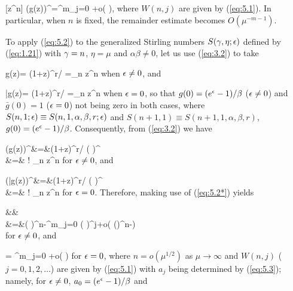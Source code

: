 \be\label{eq:5.2*}
 [z^n] (g(z))^\mu =\sum^m_{j=0} +o\left( \right),
\ee
where $W(n,j)$ are given by (\ref{eq:5.1}).
In particular, when $n$ is fixed, the remainder estimate becomes $O(\mu^{-m-1})$.

To apply (\ref{eq:5.2}) to the generalized Stirling numbers $S({\gamma}, \eta;{\epsilon})$ defined by (\ref{eq:1.21}) with ${\gamma}=n$, $\eta=\mu$ and $\alpha \beta \not= 0$, let us use (\ref{eq:3.2}) to take

\be\label{eq:5.3}
g(z)= (1+\alpha z)^{r/\alpha} =\sum_{n}  z^n
\ee
when ${\epsilon}\not= 0$, and

\be\label{eq:5.3*}
\bar g(z)= (1+\alpha z)^{r/\alpha} =\sum_{n}  z^n
\ee
when ${\epsilon}=0$, so that $g(0)=(e^{\epsilon}-1)/\beta$ (${\epsilon}\not= 0$) and $\bar g(0)=1$ (${\epsilon} =0$) not being zero in both cases, where $S(n,1;{\epsilon})\equiv S(n,1,\alpha, \beta, r;{\epsilon})$ and $S(n+1,1)\equiv S(n+1,1,\alpha,\beta,r)$, $g(0)=(e^{\epsilon}-1)/\beta$. Consequently, from (\ref{eq:3.2}) we have

\bn\label{eq:5.4}
(g(z))^\mu &=&(1+\alpha z)^{\mu r/\alpha} \left( \right)^\mu\nonumber \\&=&
\mu! \sum_{n}  z^n
\en
for ${\epsilon}\not= 0$, and

\bn\label{eq:5.4*}
 (\bar g(z))^\mu &=&(1+\alpha z)^{\mu r/\alpha} \left( \right)^\mu\nonumber \\
&=& \mu! \sum_{n}  z^n
\en
for ${\epsilon}=0$. Therefore, making use of (\ref{eq:5.2*}) yields

\bn\label{eq:5.5}
&&\nonumber\\
&=&\left( \right)^{n-\mu}\sum^m_{j=0} \left( \right)^j+o\left( \left(\right)^{n-\mu}\right)
\nonumber\\
\en
for ${\epsilon}\not= 0$, and

\be\label{eq:5.5*}
= \sum^m_{j=0} +o\left( \right)
\ee
for ${\epsilon}=0$, where $n=o(\mu^{1/2})$ as $\mu\to\infty$ and $W(n,j)$ ($j=0,1,2,\ldots$) are given by (\ref{eq:5.1}) with $a_j$ being determined by (\ref{eq:5.3}); namely, for ${\epsilon}\not= 0$, $a_0=(e^{\epsilon}-1)/\beta$ and

